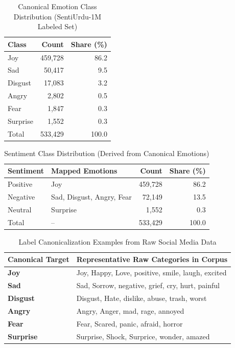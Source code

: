 \begin{table}[t]
\caption{Canonical Emotion Class Distribution (SentiUrdu-1M Labeled Set)}
\label{tab:emotion-dist}
\centering
\small
\begin{tabular}{lrr}
\toprule
Class & Count & Share (\%) \\
\midrule
Joy      & 459,728 & 86.2 \\
Sad      & 50,417  & 9.5  \\
Disgust  & 17,083  & 3.2  \\
Angry    & 2,802   & 0.5  \\
Fear     & 1,847   & 0.3  \\
Surprise & 1,552   & 0.3  \\
\midrule
Total    & 533,429 & 100.0 \\
\bottomrule
\end{tabular}
\end{table}

\begin{table}[t]
\caption{Sentiment Class Distribution (Derived from Canonical Emotions)}
\label{tab:sentiment-dist}
\centering
\small
\begin{tabular}{llrr}
\toprule
Sentiment & Mapped Emotions & Count & Share (\%) \\
\midrule
Positive & Joy & 459,728 & 86.2 \\
Negative & Sad, Disgust, Angry, Fear & 72,149 & 13.5 \\
Neutral  & Surprise & 1,552 & 0.3 \\
\midrule
Total    & -- & 533,429 & 100.0 \\
\bottomrule
\end{tabular}
\end{table}

\begin{table}[t]
\caption{Label Canonicalization Examples from Raw Social Media Data}
\label{tab:label-mapping}
\centering
\footnotesize
\begin{tabular}{lp{5.5cm}}
\toprule
Canonical Target & Representative Raw Categories in Corpus \\
\midrule
\textbf{Joy} & Joy, Happy, Love, positive, smile, laugh, excited \\
\textbf{Sad} & Sad, Sorrow, negative, grief, cry, hurt, painful \\
\textbf{Disgust} & Disgust, Hate, dislike, abuse, trash, worst \\
\textbf{Angry} & Angry, Anger, mad, rage, annoyed \\
\textbf{Fear} & Fear, Scared, panic, afraid, horror \\
\textbf{Surprise} & Surprise, Shock, Surprice, wonder, amazed \\
\bottomrule
\end{tabular}
\end{table}

